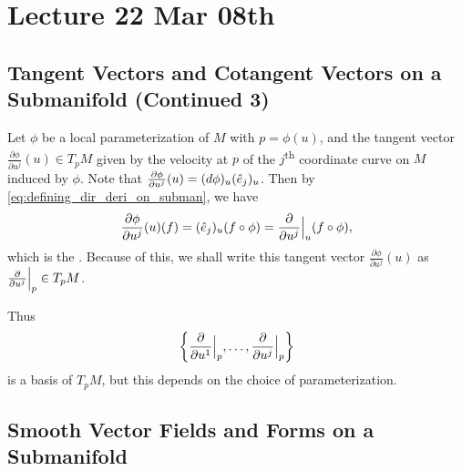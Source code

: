 \documentclass[notoc,notitlepage]{tufte-book}
\begin{document}

\chapter{Lecture 22 Mar 08th}%
\label{chp:lecture_22_mar_08th}

\section{Tangent Vectors and Cotangent Vectors on a Submanifold (Continued 3)}%
\label{sec:tangent_vectors_and_cotangent_vectors_on_a_submanifold_continued_3}

\begin{eg}\label{eg:special_case_of_the_directional_derivative}
  Let $\phi$ be a local parameterization of $M$ with $p = \phi(u)$, and the
  tangent vector $\frac{\partial \phi}{\partial u^j} (u) \in T_p M$ given by the
  velocity at $p$ of the $j$\textsuperscript{th} coordinate curve on $M$ induced
  by $\phi$. Note that $\frac{\partial \phi}{\partial u^j}(u) = (\mathop{}\!d{\phi})_u
  (\hat{e}_j)_u$. Then by \cref{eq:defining_dir_deri_on_subman}, we have
  \begin{equation*}
    \frac{\partial \phi}{\partial u^j} (u) (f) = (\hat{e}_j)_u (f \circ \phi)
    = \frac{\partial}{\partial u^j} \Big|_{u}^{} (f \circ \phi),
  \end{equation*}
  which is the . Because of this, we shall write this tangent vector
  $\frac{\partial \phi}{\partial u^j} (u)$ as $\frac{\partial}{\partial u^j}
  \Big|_{p}^{} \in T_p M$.

  Thus
  \begin{equation*}
    \left\{ \frac{\partial}{\partial u^1} \Big|_{p}^{}, \ldots,
    \frac{\partial}{\partial u^j} \Big|_{p}^{} \right\}
  \end{equation*}
  is a basis of $T_p M$, but this depends on the choice of parameterization.
\end{eg}


\section{Smooth Vector Fields and Forms on a Submanifold}%
\label{sec:smooth_vector_fields_and_forms_on_a_submanifold}
\end{document}
